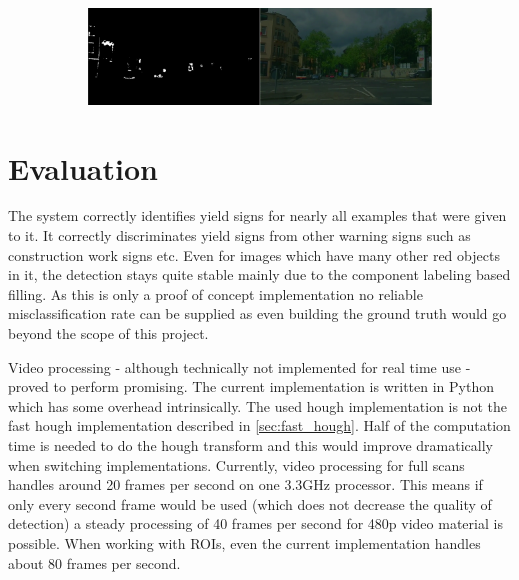 \documentclass{report}
\begin{document}
\begin{figure}
\begin{subfigure}[t]{1\textwidth}
  \end{subfigure}
  \begin{subfigure}[t]{1\textwidth}
    \includegraphics[width=1\textwidth]{src/roi/5}
  \end{subfigure}
\end{figure}
\restoregeometry

\pagebreak
\chapter{Evaluation}
\label{chap:evaluation}

The system correctly identifies yield signs for nearly all examples
that were given to it. It correctly discriminates yield signs from
other warning signs such as construction work signs etc. Even for
images which have many other red objects in it, the detection stays
quite stable mainly due to the component labeling based filling. As
this is only a proof of concept implementation no reliable
misclassification rate can be supplied as even building the ground
truth would go beyond the scope of this project.

Video processing - although technically not implemented for real time
use - proved to perform promising. The current implementation is
written in Python which has some overhead intrinsically. The used
hough implementation is not the fast hough implementation described in
\ref{sec:fast_hough}. Half of the computation time is needed to do the
hough transform and this would improve dramatically when switching
implementations. Currently, video processing for full scans handles
around 20 frames per second on one 3.3GHz processor. This means if
only every second frame would be used (which does not decrease the
quality of detection) a steady processing of 40 frames per second for
480p video material is possible. When working with ROIs, even the
current implementation handles about 80 frames per second.
\end{document}
